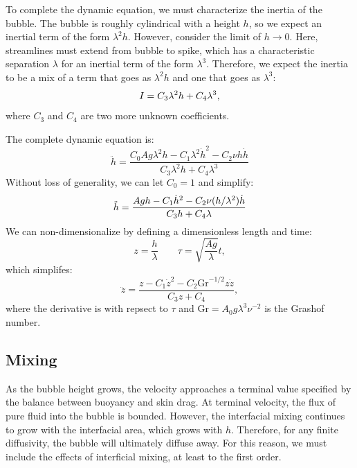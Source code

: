 To complete the dynamic equation, we must characterize the inertia of the bubble.
The bubble is roughly cylindrical with a height $h$, so we expect an inertial term of the form $\lambda^2 h$.
However, consider the limit of $h \rightarrow 0$.  
Here, streamlines must extend from bubble to spike, which has a characteristic separation $\lambda$ for an inertial term of the form $\lambda^3$.
Therefore, we expect the inertia to be a mix of a term that goes as $\lambda^2 h$ and one that goes as $\lambda^3$:
\begin{equation} \elabel{inertia}
I = C_3 \lambda^2 h + C_4 \lambda^3,
\end{equation}
where $C_3$ and $C_4$ are two more unknown coefficients.

The complete dynamic equation is:
\begin{equation}
\ddot{h} = \frac{C_0 A g \lambda^2 h - C_1 \lambda^2 \dot{h}^2 - C_2 \nu h \dot{h}}{C_3 \lambda^2 h + C_4 \lambda^3}
\end{equation}
Without loss of generality, we can let $C_0 = 1$ and simplify:
\begin{equation} \elabel{dynamics}
\ddot{h} = \frac{A g h - C_1 \dot{h}^2 - C_2 \nu (h/\lambda^2) \dot{h}}{ C_3 h + C_4 \lambda }
\end{equation}
We can non-dimensionalize by defining a dimensionless length and time:
\begin{equation}
z = \frac{h}{\lambda} \qquad \tau = \sqrt{\frac{A g}{\lambda}} t,
\end{equation}
which simplifes:
\begin{equation}
\ddot{z} = \frac{z - C_1 \dot{z}^2 - C_2 \text{Gr}^{-1/2} z \dot{z}}{C_3 z + C_4},
\end{equation}
where
the derivative is with repsect to $\tau$ and 
$\text{Gr} = A_0 g \lambda^3 \nu^{-2}$ is the Grashof number.


\subsection{Mixing}

As the bubble height grows, the velocity approaches a terminal value specified by the balance between buoyancy and skin drag.
At terminal velocity, the flux of pure fluid into the bubble is bounded.
However, the interfacial mixing continues to grow with the interfacial area, which grows with $h$.
Therefore, for any finite diffusivity, the bubble will ultimately diffuse away.
For this reason, we must include the effects of interficial mixing, at least to the first order.

